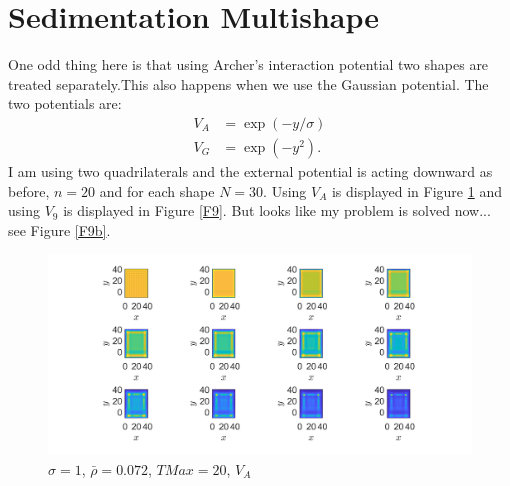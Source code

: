 \documentclass[11pt, a4paper]{article}
\theoremstyle{definition}
\begin{document}
\section{Sedimentation Multishape}
One odd thing here is that using Archer's interaction potential	two shapes are treated separately.This also happens when we use the Gaussian potential.
The two potentials are:
\begin{align*}
	V_A &= \exp(-y / \sigma)\\
	V_G &= \exp(-y^2).
\end{align*}
I am using two quadrilaterals and the external potential is acting downward as before, $n = 20$ and for each shape $N = 30$. 
Using $V_A$ is displayed in Figure \ref{F8} and using $V_9$ is displayed in Figure \ref{F9}. But looks like my problem is solved now... see Figure \ref{F9b}.
\begin{figure}[h]
	\centering
	\includegraphics[scale=0.4]{Multi1.png}
	\caption{$\sigma =1$, $\bar \rho =0.072$, $TMax = 20$, $V_A$} 
	\label{F8}
\end{figure}
\end{document}
